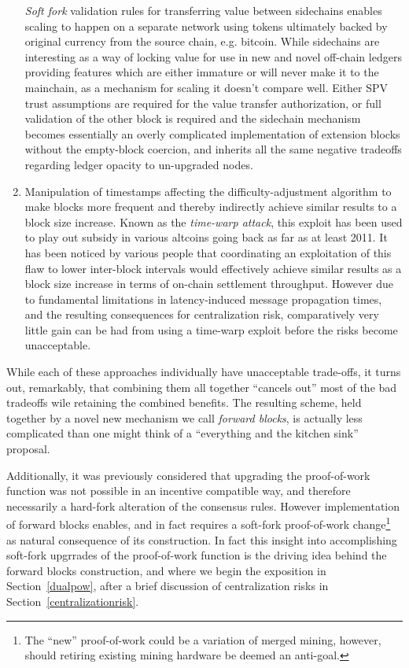 \begin{enumerate}
    \emph{Soft fork} validation rules for transferring value between
    sidechains enables scaling to happen on a separate network using
    tokens ultimately backed by original currency from the source
    chain, e.g. bitcoin.  While sidechains are interesting as a way of
    locking value for use in new and novel off-chain ledgers providing
    features which are either immature or will never make it to the
    mainchain, as a mechanism for scaling it doesn't compare well.
    Either SPV trust assumptions are required for the value transfer
    authorization, or full validation of the other block is required
    and the sidechain mechanism becomes essentially an overly
    complicated implementation of extension blocks without the
    empty-block coercion, and inherits all the same negative tradeoffs
    regarding ledger opacity to un-upgraded nodes.

  \item

    Manipulation of timestamps affecting the difficulty-adjustment
    algorithm to make blocks more frequent and thereby indirectly
    achieve similar results to a block size increase.  Known as the
    \emph{time-warp attack}, this exploit has been used to play out
    subsidy in various altcoins going back as far as at least 2011.
    It has been noticed by various people that coordinating an
    exploitation of this flaw to lower inter-block intervals would
    effectively achieve similar results as a block size increase in
    terms of on-chain settlement throughput.  However due to
    fundamental limitations in latency-induced message propagation
    times, and the resulting consequences for centralization risk,
    comparatively very little gain can be had from using a time-warp
    exploit before the risks become unacceptable.

\end{enumerate}

While each of these approaches individually have unacceptable
trade-offs, it turns out, remarkably, that combining them all together
``cancels out'' most of the bad tradeoffs wile retaining the combined
benefits.  The resulting scheme, held together by a novel new
mechanism we call \emph{forward blocks}, is actually less complicated
than one might think of a ``everything and the kitchen sink''
proposal.

Additionally, it was previously considered that upgrading the
proof-of-work function was not possible in an incentive compatible
way, and therefore necessarily a hard-fork alteration of the consensus
rules.  However implementation of forward blocks enables, and in fact
requires a soft-fork proof-of-work change\footnote{The ``new''
  proof-of-work could be a variation of merged mining, however, should
  retiring existing mining hardware be deemed an anti-goal.} as
natural consequence of its construction.  In fact this insight into
accomplishing soft-fork upgrrades of the proof-of-work function is the
driving idea behind the forward blocks construction, and where we
begin the exposition in Section~\ref{dualpow}, after a brief
discussion of centralization risks in
Section~\ref{centralizationrisk}.

